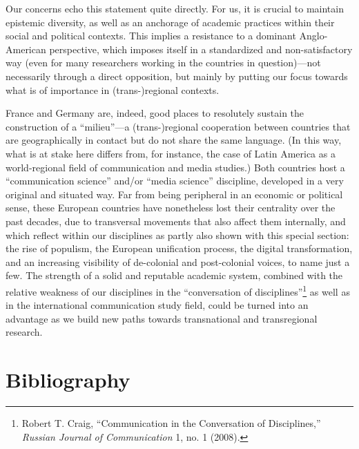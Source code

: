 \documentclass{tufte-handout}
\begin{document}
Our concerns echo this statement quite directly. For us, it is crucial
to maintain epistemic diversity, as well as an anchorage of academic
practices within their social and political contexts. This implies a
resistance to a dominant Anglo-American perspective, which imposes
itself in a standardized and non-satisfactory way (even for many
researchers working in the countries in question)---not necessarily
through a direct opposition, but mainly by putting our focus towards
what is of importance in (trans-)regional contexts.

France and Germany are, indeed, good places to resolutely sustain the
construction of a ``milieu''---a (trans-)regional cooperation between
countries that are geographically in contact but do not share the same
language. (In this way, what is at stake here differs from, for
instance, the case of Latin America as a world-regional field of
communication and media studies.) Both countries host a ``communication
science'' and/or ``media science'' discipline, developed in a very
original and situated way. Far from being peripheral in an economic or
political sense, these European countries have nonetheless lost their
centrality over the past decades, due to transversal movements that also
affect them internally, and which reflect within our disciplines as
partly also shown with this special section: the rise of populism, the
European unification process, the digital transformation, and an
increasing visibility of de-colonial and post-colonial voices, to name
just a few. The strength of a solid and reputable academic system,
combined with the relative weakness of our disciplines in the
``conversation of disciplines''\footnote{Robert T. Craig,
  ``Communication in the Conversation of Disciplines,'' \emph{Russian
  Journal of Communication} 1, no. 1 (2008).} as well as in the
international communication study field, could be turned into an
advantage as we build new paths towards transnational and transregional
research.

\section{Bibliography}\label{bibliography}
\end{document}
